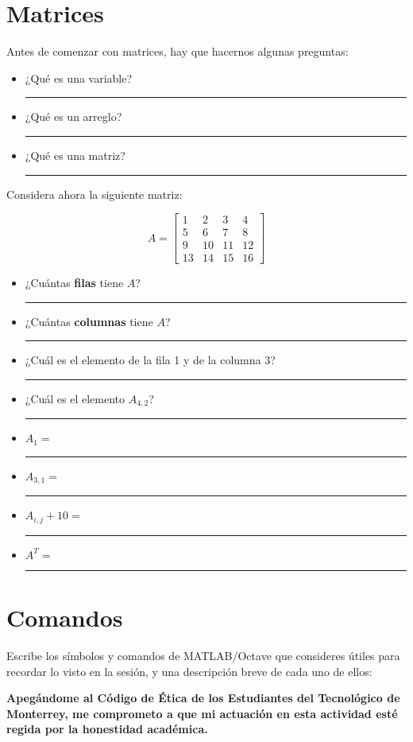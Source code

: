 \documentclass[spanish, 10pt]{article}
\newcommand{\shortresponserule}{{\large\rule{5 cm}{0.3mm}}}
\begin{document}
\section{Matrices}

Antes de comenzar con matrices, hay que hacernos algunas preguntas:

\begin{itemize}
    \item ¿Qué es una variable? \hfill \shortresponserule
    \item ¿Qué es un arreglo? \hfill \shortresponserule
	\item ¿Qué es una matriz? \hfill \shortresponserule
\end{itemize}

Considera ahora la siguiente matriz:

$$A = \begin{bmatrix}
    1 & 2 & 3 & 4\\
    5 & 6 & 7 & 8\\
    9 & 10 & 11 & 12\\
    13 & 14 & 15& 16
\end{bmatrix}$$

\begin{itemize}
    \item ¿Cuántas \textbf{filas} tiene $A$? \hfill \shortresponserule
    \item ¿Cuántas \textbf{columnas} tiene $A$? \hfill \shortresponserule
    \item ¿Cuál es el elemento de la fila 1 y de la columna 3? \hfill \shortresponserule
    \item ¿Cuál es el elemento $A_{4,2}$? \hfill \shortresponserule
\end{itemize}

\begin{itemize}
    \item $A_{1} =$ \hfill \shortresponserule
    \item $A_{3,1} =$ \hfill \shortresponserule
    \item $A_{i,j} + 10 =$ \hfill \shortresponserule
    \item $A^T =$ \hfill \shortresponserule
\end{itemize}

\section{Comandos}

Escribe los símbolos y comandos de MATLAB/Octave que consideres útiles para recordar lo visto en la sesión, y una descripción breve de cada uno de ellos:

\vfill

\textbf{Apegándome al Código de Ética de los Estudiantes del Tecnológico de Monterrey, me comprometo a que mi actuación en esta actividad esté regida por la honestidad académica.}
\end{document}
